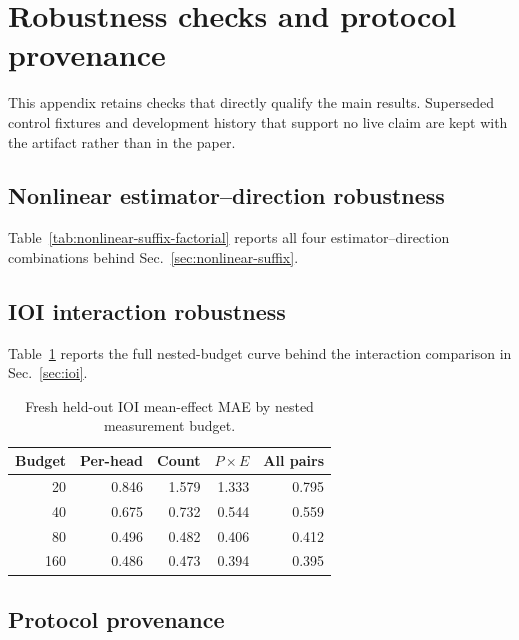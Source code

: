 \section{Robustness checks and protocol provenance}
\label{app:earlier-diagnostics}

This appendix retains checks that directly qualify the main results. Superseded
control fixtures and development history that support no live claim are kept
with the artifact rather than in the paper.

\subsection{Nonlinear estimator--direction robustness}

Table~\ref{tab:nonlinear-suffix-factorial} reports all four
estimator--direction combinations behind Sec.~\ref{sec:nonlinear-suffix}.



\subsection{IOI interaction robustness}

Table~\ref{tab:ioi-budget-appendix} reports the full nested-budget curve behind
the interaction comparison in Sec.~\ref{sec:ioi}.

\begin{table}[H]
\centering
\small
\begin{tabular}{@{}rrrrr@{}}
\toprule
Budget & Per-head & Count & $P\!\times\!E$ & All pairs \\
\midrule
20  & 0.846 & 1.579 & 1.333 & 0.795 \\
40  & 0.675 & 0.732 & 0.544 & 0.559 \\
80  & 0.496 & 0.482 & 0.406 & 0.412 \\
160 & 0.486 & 0.473 & 0.394 & 0.395 \\
\bottomrule
\end{tabular}
\caption{Fresh held-out IOI mean-effect MAE by nested measurement budget.}
\label{tab:ioi-budget-appendix}
\end{table}

\subsection{Protocol provenance}

